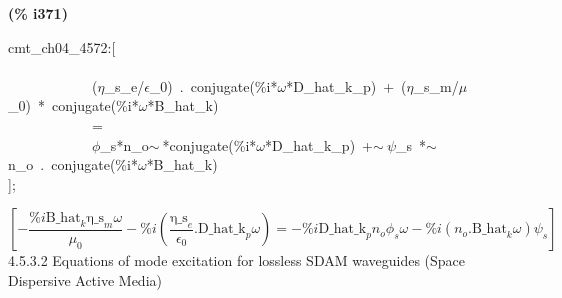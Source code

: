 \documentclass[fleqn]{article}
\begin{document}
\noindent
\begin{minipage}[t]{4.000000em}\color{red}\bfseries
(\% i371)	
\end{minipage}
\begin{minipage}[t]{\textwidth}\color{blue}
cmt\_ch04\_4572:[\\
\\
\ \ \ \ \ \ \ \ \ \ \ \ (\ensuremath{\eta}\_s\_e/\ensuremath{\epsilon}\_0)\ .\ conjugate(\%i*\ensuremath{\omega}*D\_hat\_k\_p)\ +\ (\ensuremath{\eta}\_s\_m/\ensuremath{\mu}\_0)\ *\ conjugate(\%i*\ensuremath{\omega}*B\_hat\_k)\\
\ \ \ \ \ \ \ \ \ \ \ \ =\\
\ \ \ \ \ \ \ \ \ \ \ \ \ensuremath{\phi}\_s*n\_o\ensuremath{\sim\ }*conjugate(\%i*\ensuremath{\omega}*D\_hat\_k\_p)\ +\ensuremath{\sim\ }\ensuremath{\psi}\_s\ *\ensuremath{\sim\ }n\_o\ .\ conjugate(\%i*\ensuremath{\omega}*B\_hat\_k)\\
];
\end{minipage}
\[\displaystyle \tag{\% o371} 
\left[ -\frac{\% i {{\ensuremath{\mathrm{B\_ hat}}}_k} {{\ensuremath{\mathrm{\eta \_ s}}}_m} \omega }{{{\mu }_0}}-\% i \left( \frac{{{\ensuremath{\mathrm{\eta \_ s}}}_e}}{{{\epsilon }_0}}\ensuremath{\mathrm{ . }}{{\ensuremath{\mathrm{D\_ hat\_ k}}}_p} \omega \right) =-\% i {{\ensuremath{\mathrm{D\_ hat\_ k}}}_p} {n_o} {{\phi }_s} \omega -\% i \left( {n_o}\ensuremath{\mathrm{ . }}{{\ensuremath{\mathrm{B\_ hat}}}_k} \omega \right)  {{\psi }_s}\right] \mbox{}
\]
4.5.3.2     Equations of mode excitation for lossless SDAM waveguides (Space Dispersive Active Media)
\end{document}
